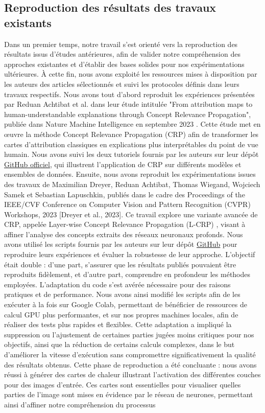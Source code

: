 \documentclass[runningheads]{llncs}
\begin{document}
\subsection{Reproduction des résultats des travaux existants}

Dans un premier temps, notre travail s’est orienté vers la reproduction des résultats issus d’études antérieures, afin de valider notre compréhension des approches existantes et d’établir des bases solides pour nos expérimentations ultérieures. À cette fin, nous avons exploité les ressources mises à disposition par les auteurs des articles sélectionnés et suivi les protocoles définis dans leurs travaux respectifs. Nous avons tout d’abord reproduit les expériences présentées par Reduan Achtibat et al. dans leur étude intitulée "From attribution maps to human-understandable explanations through Concept Relevance Propagation", publiée dans Nature Machine Intelligence en septembre 2023 \autocite{Achtibat2023}. Cette étude met en œuvre la méthode Concept Relevance Propagation (CRP) afin de transformer les cartes d’attribution classiques en explications plus interprétables du point de vue humain. Nous avons suivi les deux tutoriels fournis par les auteurs sur leur dépôt \href{https://github.com/rachtibat/zennit-crp/blob/master/README.md}{GitHub officiel}, qui illustrent l’application de CRP sur différents modèles et ensembles de données. Ensuite, nous avons reproduit les expérimentations issues des travaux de Maximilian Dreyer, Reduan Achtibat, Thomas Wiegand, Wojciech Samek et Sebastian Lapuschkin, publiés dans le cadre des Proceedings of the IEEE/CVF Conference on Computer Vision and Pattern Recognition (CVPR) Workshops, 2023 [Dreyer et al., 2023]. Ce travail explore une variante avancée de CRP, appelée Layer-wise Concept Relevance Propagation (L-CRP) \autocite{inproceedings}, visant à affiner l’analyse des concepts extraits des réseaux neuronaux profonds. Nous avons utilisé les scripts fournis par les auteurs sur leur dépôt \href{https://github.com/maxdreyer/L-CRP}{GitHub} pour reproduire leurs expériences et évaluer la robustesse de leur approche. L'objectif était double : d'une part, s'assurer que les résultats publiés pouvaient être reproduits fidèlement, et d'autre part, comprendre en profondeur les méthodes employées. L’adaptation du code s’est avérée nécessaire pour des raisons pratiques et de performance. Nous avons ainsi modifié les scripts afin de les exécuter à la fois sur Google Colab, permettant de bénéficier de ressources de calcul GPU plus performantes, et sur nos propres machines locales, afin de réaliser des tests plus rapides et flexibles. Cette adaptation a impliqué la suppression ou l’ajustement de certaines parties jugées moins critiques pour nos objectifs, ainsi que la réduction de certains calculs complexes, dans le but d’améliorer la vitesse d’exécution sans compromettre significativement la qualité des résultats obtenus. Cette phase de reproduction a été concluante : nous avons réussi à générer des cartes de chaleur illustrant l’activation des différentes couches pour des images d’entrée. Ces cartes sont essentielles pour visualiser quelles parties de l’image sont mises en évidence par le réseau de neurones, permettant ainsi d’affiner notre compréhension du processus 
\end{document}
